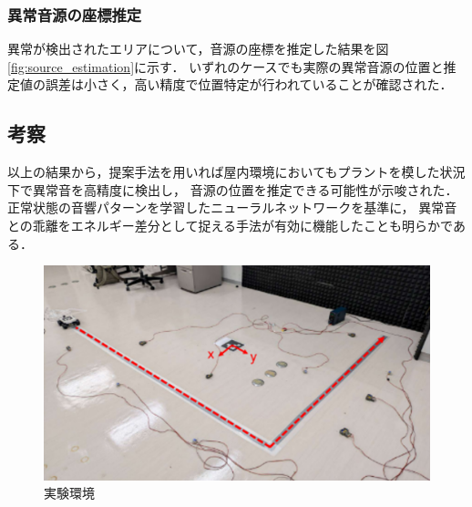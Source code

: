 \documentclass[../main]{subfiles}
\begin{document}
\subsubsection{異常音源の座標推定} \label{subsubsec:source_localization}

異常が検出されたエリアについて，音源の座標を推定した結果を図\ref{fig:source_estimation}に示す．
いずれのケースでも実際の異常音源の位置と推定値の誤差は小さく，高い精度で位置特定が行われていることが確認された．

\subsection{考察} \label{subsec:discussion}

以上の結果から，提案手法を用いれば屋内環境においてもプラントを模した状況下で異常音を高精度に検出し，
音源の位置を推定できる可能性が示唆された．
正常状態の音響パターンを学習したニューラルネットワークを基準に，
異常音との乖離をエネルギー差分として捉える手法が有効に機能したことも明らかである．


\begin{figure}[t]
  \centering
  \includegraphics[keepaspectratio, width=1.0\linewidth]{chap4/env_experiment.png}
  \caption{実験環境}
  \label{fig:exp_setup}
\end{figure}
\end{document}
